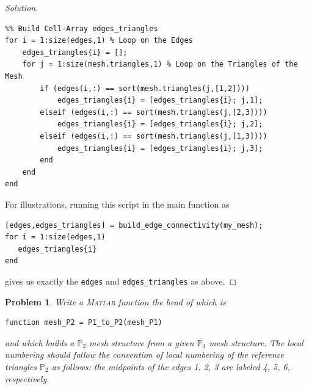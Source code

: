 \documentclass[11pt,a4paper,center,notitlepage]{article}
\numberwithin{equation}{section}
\newtheorem{prob}{Problem}[section]
\begin{document}
\begin{proof}[Solution]
\begin{verbatim}
%% Build Cell-Array edges_triangles
for i = 1:size(edges,1) % Loop on the Edges
    edges_triangles{i} = [];
    for j = 1:size(mesh.triangles,1) % Loop on the Triangles of the Mesh
        if (edges(i,:) == sort(mesh.triangles(j,[1,2])))
            edges_triangles{i} = [edges_triangles{i}; j,1];
        elseif (edges(i,:) == sort(mesh.triangles(j,[2,3])))
            edges_triangles{i} = [edges_triangles{i}; j,2];
        elseif (edges(i,:) == sort(mesh.triangles(j,[1,3])))
            edges_triangles{i} = [edges_triangles{i}; j,3];
        end
    end
end
\end{verbatim}
For illustrations, running this script in the main function as
\begin{verbatim}
[edges,edges_triangles] = build_edge_connectivity(my_mesh);
for i = 1:size(edges,1)
   edges_triangles{i} 
end
\end{verbatim}
gives us exactly the \verb|edges| and \verb|edges_triangles| as above.
\end{proof}

\begin{prob}
Write a \textsc{Matlab} function the head of which is
\begin{verbatim}
function mesh_P2 = P1_to_P2(mesh_P1)
\end{verbatim}
and which builds a $\mathbb{P}_2$ mesh structure from a given $\mathbb{P}_1$ mesh structure. The local numbering should follow the convention of local numbering of the reference triangles $\mathbb{P}_2$ as follows: the midpoints of the edges 1, 2, 3 are labeled 4, 5, 6, respectively.
\end{prob}
\end{document}
